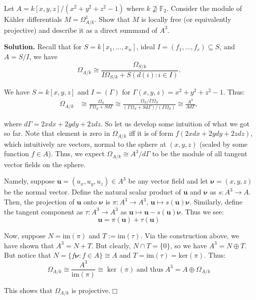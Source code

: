 \documentclass{template}
\newcommand{\qedwhite}{\hfill \ensuremath{\Box}}
\begin{document}
\begin{problem}[Exercise 5]
    Let $A=k[x,y,z]/(x^2+y^2+z^2-1)$ where $k \not\supseteq \mathbb{F}_2$. Consider the 
    module of Kähler differentials $M=\Omega^1_{A/k}$. Show that $M$ is locally 
    free (or equivalently projective) and describe it as a direct summand of $A^3$.
\end{problem}

\textbf{Solution.} Recall that for $S=k[x_1,\dots,x_n]$, ideal $I=(f_1,\dots,f_r)
\subseteq S$, and $A = S/I$, we have
\begin{equation*}
    \Omega_{A/k} \cong \frac{\Omega_{S/k}}{I\Omega_{S/k} + S(d(i): i \in I)}.
\end{equation*}

We have $S=k[x,y,z]$ and $I=(\Gamma)$ for $\Gamma(x,y,z)=x^2+y^2+z^2-1$. Thus:
\begin{align*}
    \Omega_{A/k} &\cong \frac{\Omega_{S}}{\Gamma\Omega_{S} + Sd\Gamma} \cong \frac{\Omega_S / \Gamma\Omega_S}{(\Gamma\Omega_S+Sd\Gamma)/(\Gamma\Omega_S)} \cong \frac{A^3}{Ad\Gamma},
\end{align*}

where $d\Gamma = 2xdx+2ydy+2zdz$. So let us develop some intuition of what we
got so far. Note that element is zero in $\Omega_{A/k}$ iff it is of form
$f(2xdx+2ydy+2zdz)$, which intuitively are vectors, normal to the sphere at
$(x,y,z)$ (scaled by some function $f \in A$). Thus, we expect $\Omega_{A/k}
\cong A^3/d\Gamma$ to be the module of all tangent vector fields on the sphere.

Namely, suppose $\mathbf{u} = (u_x,u_y,u_z) \in A^3$ be any vector field and let
$\boldsymbol{\nu}=(x,y,z)$ be the normal vector. Define the natural scalar
product of $\mathbf{u}$ and $\boldsymbol{\nu}$ as $s: A^3 \to A$. Then, the
projection of $\mathbf{u}$ onto $\boldsymbol{\nu}$ is $\pi: A^3 \to A^3$,
$\mathbf{u} \mapsto s(\mathbf{u})\boldsymbol{\nu}$. Similarly, define the
tangent component as $\tau: A^3 \to A^3$ as $\mathbf{u} \mapsto \mathbf{u} -
s(\mathbf{u})\boldsymbol{\nu}$. Thus we see:
\begin{equation*}
    \mathbf{u} = \pi(\mathbf{u}) + \tau(\mathbf{u})
\end{equation*}

Now, suppose $N = \text{im}(\pi)$ and $T := \text{im}(\tau)$. Via the
construction above, we have shown that $A^3 = N + T$. But clearly, $N \cap T =
\{0\}$, so we have $A^3 = N \oplus T$. But notice that $N = \{f\boldsymbol{\nu}:
f \in A\} \cong A$ and $T = \text{im}(\tau) = \text{ker}(\pi)$. Thus:
\begin{equation*}
    \Omega_{A/k} \cong \frac{A^3}{\text{im}(\pi)} \cong \ker(\pi) \; \text{and thus} \; \boxed{A^3 = A \oplus \Omega_{A/k}}
\end{equation*}

This shows that $\Omega_{A/k}$ is projective.\qedwhite
\end{document}
